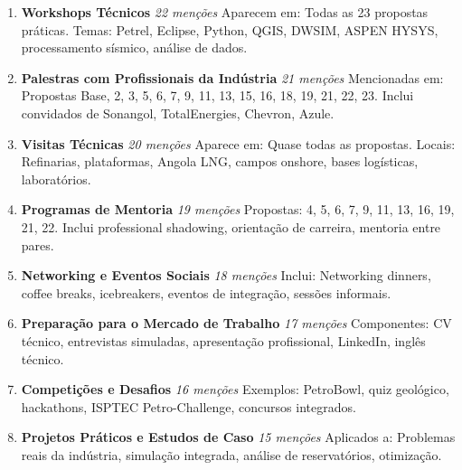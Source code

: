 \documentclass[12pt,a4paper]{article}
\begin{document}
\begin{enumerate}[itemsep=0.3cm, font=\bfseries]

\item \textbf{Workshops Técnicos} \quad \textit{22 menções}
\newline Aparecem em: Todas as 23 propostas práticas. Temas: Petrel, Eclipse, Python, QGIS, DWSIM, ASPEN HYSYS, processamento sísmico, análise de dados.

\item \textbf{Palestras com Profissionais da Indústria} \quad \textit{21 menções}
\newline Mencionadas em: Propostas Base, 2, 3, 5, 6, 7, 9, 11, 13, 15, 16, 18, 19, 21, 22, 23. Inclui convidados de Sonangol, TotalEnergies, Chevron, Azule.

\item \textbf{Visitas Técnicas} \quad \textit{20 menções}
\newline Aparece em: Quase todas as propostas. Locais: Refinarias, plataformas, Angola LNG, campos onshore, bases logísticas, laboratórios.

\item \textbf{Programas de Mentoria} \quad \textit{19 menções}
\newline Propostas: 4, 5, 6, 7, 9, 11, 13, 16, 19, 21, 22. Inclui professional shadowing, orientação de carreira, mentoria entre pares.

\item \textbf{Networking e Eventos Sociais} \quad \textit{18 menções}
\newline Inclui: Networking dinners, coffee breaks, icebreakers, eventos de integração, sessões informais.

\item \textbf{Preparação para o Mercado de Trabalho} \quad \textit{17 menções}
\newline Componentes: CV técnico, entrevistas simuladas, apresentação profissional, LinkedIn, inglês técnico.

\item \textbf{Competições e Desafios} \quad \textit{16 menções}
\newline Exemplos: PetroBowl, quiz geológico, hackathons, ISPTEC Petro-Challenge, concursos integrados.

\item \textbf{Projetos Práticos e Estudos de Caso} \quad \textit{15 menções}
\newline Aplicados a: Problemas reais da indústria, simulação integrada, análise de reservatórios, otimização.


\end{enumerate}
\end{document}

